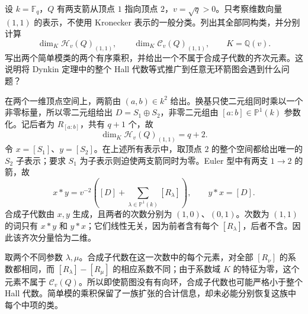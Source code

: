 \begin{exercise}\label{b5:ex:B:20}
	设 \(k=\mathbb F_q\)，\(Q\) 有两支箭从顶点 \(1\) 指向顶点 \(2\)，\(v=\sqrt q>0\)。只考察维数向量 \((1,1)\) 的表示，不使用 Kronecker 表示的一般分类。列出其全部同构类，并分别计算
	\[
		\dim_K\mathcal H_v(Q)_{(1,1)},\qquad
		\dim_K\mathcal C_v(Q)_{(1,1)},\qquad K=\mathbb Q(v).
	\]
	写出两个简单模类的两个有序乘积，并给出一个不属于合成子代数的齐次元素。这说明将 Dynkin 定理中的整个 Hall 代数等式推广到任意无环箭图会遇到什么问题？
\end{exercise}
\begin{solution}
	在两个一维顶点空间上，两箭由 \((a,b)\in k^2\) 给出。换基只使二元组同时乘以一个非零标量，所以零二元组给出 \(D=S_1\oplus S_2\)，非零二元组由 \([a:b]\in\mathbb P^1(k)\) 参数化。记后者为 \(R_{[a:b]}\)，共有 \(q+1\) 个，故
	\[
		\dim_K\mathcal H_v(Q)_{(1,1)}=q+2.
	\]
	令 \(x=[S_1]\)、\(y=[S_2]\)。在上述所有表示中，取顶点 \(2\) 的整个空间都给出唯一的 \(S_2\) 子表示；要求 \(S_1\) 为子表示则迫使两支箭同时为零。Euler 型中有两支 \(1\to2\) 的箭，故
	\[
		x*y=v^{-2}\left([D]+\sum_{\lambda\in\mathbb P^1(k)}[R_\lambda]\right),
		\qquad y*x=[D].
	\]
	合成子代数由 \(x,y\) 生成，且两者的次数分别为 \((1,0)\)、\((0,1)\)。次数为 \((1,1)\) 的词只有 \(x*y\) 和 \(y*x\)；它们线性无关，因为前者含有每个 \([R_\lambda]\)，后者不含。因此该齐次分量恰为二维。

	取两个不同参数 \(\lambda,\mu\)。合成子代数在这一次数中的每个元素，对全部 \([R_\nu]\) 的系数都相同，而 \([R_\lambda]-[R_\mu]\) 的相应系数不同；由于系数域 \(K\) 的特征为零，这个元素不属于 \(\mathcal C_v(Q)\)。所以即使箭图没有有向环，合成子代数也可能严格小于整个 Hall 代数。简单模的乘积保留了一族扩张的合计信息，却未必能分别恢复这族中每个中项的类。
\end{solution}
